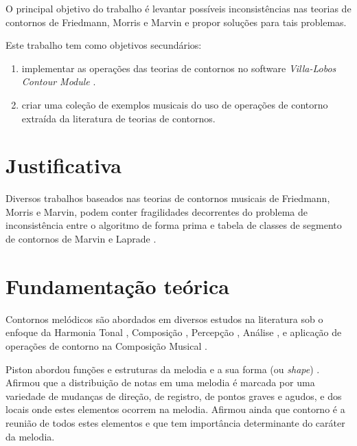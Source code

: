 \documentclass[12pt]{article}
\newcommand{\eng}[1]{\textit{#1}}
\begin{document}
O principal objetivo do trabalho é levantar possíveis inconsistências
nas teorias de contornos de Friedmann, Morris e Marvin e propor
soluções para tais problemas.

Este trabalho tem como objetivos secundários:

\begin{enumerate}
\item implementar as operações das teorias de contornos no software
  \eng{Villa-Lobos Contour Module} \cite{sampaio.ea10:villa-lobos}.
\item criar uma coleção de exemplos musicais do uso de operações de
  contorno extraída da literatura de teorias de contornos.
\end{enumerate}

\section{Justificativa}
\label{sec:justificativa}

Diversos trabalhos baseados nas teorias de contornos musicais de
Friedmann, Morris e Marvin, podem conter fragilidades decorrentes do
problema de inconsistência entre o algoritmo de forma prima e tabela
de classes de segmento de contornos de Marvin e Laprade
\cite{marvin.ea87:relating}.

\section{Fundamentação teórica}
\label{sec:fund-teor}


Contornos melódicos são abordados em diversos estudos na literatura
sob o enfoque da Harmonia Tonal \cite{piston59:harmony}, Composição
\cite{schoenberg67:fundamentals,toch77:shaping}, Percepção
\cite{edworthy85:musical,dewitt.ea86:recognition}, Análise
\cite{adams76:melodic,friedmann85:methodology,friedmann87:response,marvin.ea87:relating,marvin88:generalized,marvin91:perception,marvin.ea95:generalization,morris87:composition,morris93:directions,morris95:compositional,clifford95:contour,beard03:contour,bor09:contour,schultz08:melodic,schultz09:diachronic},
e aplicação de operações de contorno na Composição Musical
\cite{sampaio08:em}.



Piston abordou funções e estruturas da melodia e a sua forma (ou
\eng{shape}) \cite{piston59:harmony}. Afirmou que a distribuição de
notas em uma melodia é marcada por uma variedade de mudanças de
direção, de registro, de pontos graves e agudos, e dos locais onde
estes elementos ocorrem na melodia. Afirmou ainda que contorno é a
reunião de todos estes elementos e que tem importância determinante do
caráter da melodia.
\end{document}
